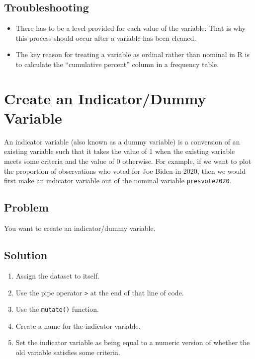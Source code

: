 \documentclass[
]{book}
\providecommand{\tightlist}{%
  \setlength{\itemsep}{0pt}\setlength{\parskip}{0pt}}
\begin{document}
\hypertarget{troubleshooting-16}{%
\subsection{Troubleshooting}\label{troubleshooting-16}}

\begin{itemize}
\tightlist
\item
  There has to be a level provided for each value of the variable. That is why this process should occur after a variable has been cleaned.
\item
  The key reason for treating a variable as ordinal rather than nominal in R is to calculate the ``cumulative percent'' column in a frequency table.
\end{itemize}

\hypertarget{indicator}{%
\section{Create an Indicator/Dummy Variable}\label{indicator}}

An indicator variable (also known as a dummy variable) is a conversion of an existing variable such that it takes the value of 1 when the existing variable meets some criteria and the value of 0 otherwise. For example, if we want to plot the proportion of observations who voted for Joe Biden in 2020, then we would first make an indicator variable out of the nominal variable \texttt{presvote2020}.

\hypertarget{problem-20}{%
\subsection{Problem}\label{problem-20}}

You want to create an indicator/dummy variable.

\hypertarget{solution-19}{%
\subsection{Solution}\label{solution-19}}

\begin{enumerate}
\def\labelenumi{\arabic{enumi}.}
\tightlist
\item
  Assign the dataset to itself.
\item
  Use the pipe operator \texttt{\textbar{}\textgreater{}} at the end of that line of code.
\item
  Use the \texttt{mutate()} function.
\item
  Create a name for the indicator variable.
\item
  Set the indicator variable as being equal to a numeric version of whether the old variable satisfies some criteria.
\end{enumerate}
\end{document}
